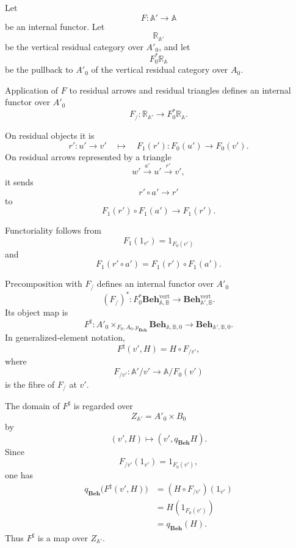 Let
\[
    F:\mathbb A'\to\mathbb A
\]
be an internal functor. Let
\[
    \mathbb R_{\mathbb A'}
\]
be the vertical residual category over \(A'_0\), and let
\[
    F_0^*\mathbb R_{\mathbb A}
\]
be the pullback to \(A'_0\) of the vertical residual category over \(A_0\).

\begin{definition}
\label{def:internal-residual-slice-functor}
    Application of \(F\) to residual arrows and residual triangles defines an
    internal functor over \(A'_0\)
    \[
        F_{/}:
        \mathbb R_{\mathbb A'}
        \longrightarrow
        F_0^*\mathbb R_{\mathbb A}.
    \]

    On residual objects it is
    \[
        r':u'\to v'
        \quad\longmapsto\quad
        F_1(r'):F_0(u')\to F_0(v').
    \]
    On residual arrows represented by a triangle
    \[
        w'\xrightarrow{a'}u'\xrightarrow{r'}v',
    \]
    it sends
    \[
        r'\circ a'\to r'
    \]
    to
    \[
        F_1(r')\circ F_1(a')
        \longrightarrow
        F_1(r').
    \]
\end{definition}

Functoriality follows from
\[
    F_1(1_{v'})=1_{F_0(v')}
\]
and
\[
    F_1(r'\circ a')
    =
    F_1(r')\circ F_1(a').
\]

Precomposition with \(F_{/}\) defines an internal functor over \(A'_0\)
\[
    (F_{/})^*:
    F_0^*
    \mathbf{Beh}^{\mathrm{vert}}_{\mathbb A,\mathbb B}
    \longrightarrow
    \mathbf{Beh}^{\mathrm{vert}}_{\mathbb A',\mathbb B}.
\]
Its object map is
\[
    F^\sharp:
    A'_0\times_{F_0,A_0,p_{\mathbf{Beh}}}
    \mathbf{Beh}_{\mathbb A,\mathbb B,0}
    \longrightarrow
    \mathbf{Beh}_{\mathbb A',\mathbb B,0}.
\]
In generalized-element notation,
\[
    F^\sharp(v',H)
    =
    H\circ F_{/v'},
\]
where
\[
    F_{/v'}:
    \mathbb A'/v'
    \to
    \mathbb A/F_0(v')
\]
is the fibre of \(F_{/}\) at \(v'\).

The domain of \(F^\sharp\) is regarded over
\[
    Z_{\mathbb A'}=A'_0\times B_0
\]
by
\[
    (v',H)\longmapsto(v',q_{\mathbf{Beh}}H).
\]
Since
\[
    F_{/v'}(1_{v'})=1_{F_0(v')},
\]
one has
\[
\begin{aligned}
    q_{\mathbf{Beh}}
    \bigl(
        F^\sharp(v',H)
    \bigr)
    &=
    (H\circ F_{/v'})(1_{v'})
    \\
    &=
    H(1_{F_0(v')})
    \\
    &=
    q_{\mathbf{Beh}}(H).
\end{aligned}
\]
Thus \(F^\sharp\) is a map over \(Z_{\mathbb A'}\).

